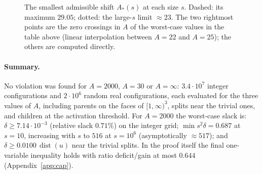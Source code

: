 \documentclass[11pt]{article}
\theoremstyle{definition}
\numberwithin{equation}{section}
\begin{document}
\begin{figure}[ht]
\centering
{}
\caption{The smallest admissible shift $A_*(s)$ at each size $s$. Dashed: its maximum $29.05$; dotted: the large-$s$ limit
$\approx23$. The two rightmost points are the zero crossings in $A$ of the worst-case values in the table above (linear
interpolation between $A=22$ and $A=25$); the others are computed directly.}\label{fig:thr}
\end{figure}

\paragraph{Summary.} No violation was found for $A=2000$, $A=30$ or $A=\infty$: $3.4\cdot10^7$ integer configurations and
$2\cdot10^6$ random real configurations, each evaluated for the three values of $A$, including parents on the faces of
$[1,\infty)^3$, splits near the trivial ones, and children at the activation threshold. For $A=2000$ the worst-case slack is: $\delta\ge7.14\cdot10^{-3}$ (relative slack $0.71\%$)
on the integer grid; $\min s^2\delta=0.687$ at $s=10$, increasing with $s$ to $516$ at $s=10^6$ (asymptotically $\approx517$);
and $\delta\ge0.0100\,\operatorname{dist}(u)$ near the trivial splits. In the proof itself the final one-variable inequality
holds with ratio deficit/gain at most $0.644$ (Appendix~\ref{app:cap}).

\appendix
\end{document}
